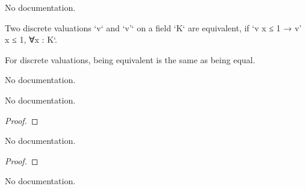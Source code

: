 \begin{definition}
\begin{theorem}\label{lt_one_lt_one_of_le_one_le_one}
                No documentation.
    \end{theorem}

\begin{theorem}\label{isEquiv_of_le_one_le_one}
                Two discrete valuations `v` and `v'` on a field `K` are equivalent, if `v x ≤ 1 → v' x ≤ 1, ∀x : K`.
    \end{theorem}

\begin{theorem}\label{isEquiv_iff_eq}
                For discrete valuations, being equivalent is the same as being equal.
    \end{theorem}

\begin{definition}\label{Valuation.Nontrivial}
        \leanok
                No documentation.
    \end{definition}

\begin{theorem}\label{Valuation.nontrivial_def}
        \leanok
                No documentation.
    \end{theorem}

\begin{proof}
    \leanok
\end{proof}

\begin{theorem}\label{DiscreteValuation.valuationSubring_DVR_of_equiv_discrete}
        \leanok
                No documentation.
    \end{theorem}

\begin{proof}
    \leanok
\end{proof}

\begin{definition}\label{DiscreteValuation.ofNontrivial}
                No documentation.
    \end{definition}


\end{definition}
